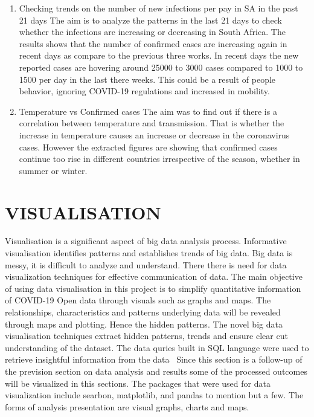 \documentclass[12pt]{article}
\begin{document}
\begin{enumerate}
    
    \item Checking trends on the number of new infections per pay in SA in the past 21 days
    The aim is to analyze the patterns in the last 21 days  to check whether the infections are increasing or decreasing in South Africa. The results shows that the number of confirmed cases are increasing again in recent days as compare to the previous three works. In recent days the new reported cases are hovering around 25000 to 3000 cases compared to 1000 to 1500 per day in the last there weeks. This could be a result of people behavior, ignoring COVID-19 regulations and increased in mobility. 
     
     \item Temperature vs Confirmed cases
     The aim was to find out if there is a correlation between temperature and transmission. That is whether the increase in temperature causes an increase or decrease in the coronavirus cases. However the extracted figures are showing that confirmed cases continue too rise in different countries irrespective of the season, whether in summer or winter. 
    
\end{enumerate}

\section{VISUALISATION}
Visualisation is a significant aspect of big data analysis process. Informative visualisation identifies patterns and establishes trends of big data. Big data is messy, it is difficult to analyze and understand. There there is need for data visualization techniques for effective communication of data. The main objective of using data visualisation in this project is to simplify quantitative information of COVID-19 Open data through visuals such as graphs and maps. The relationships, characteristics and patterns underlying data will be revealed through maps and plotting. Hence the  hidden patterns. The novel big data visualisation techniques extract hidden patterns, trends and ensure clear cut understanding of the dataset. The data quries built in SQL language were used to retrieve insightful information from the data
\
Since this section is a follow-up of the prevision section on data analysis and results some of the processed outcomes will be visualized in this sections. The packages that were used for data visualization include searbon, matplotlib, and pandas to mention but a few. The forms of analysis presentation are visual graphs, charts and maps.
\end{document}

